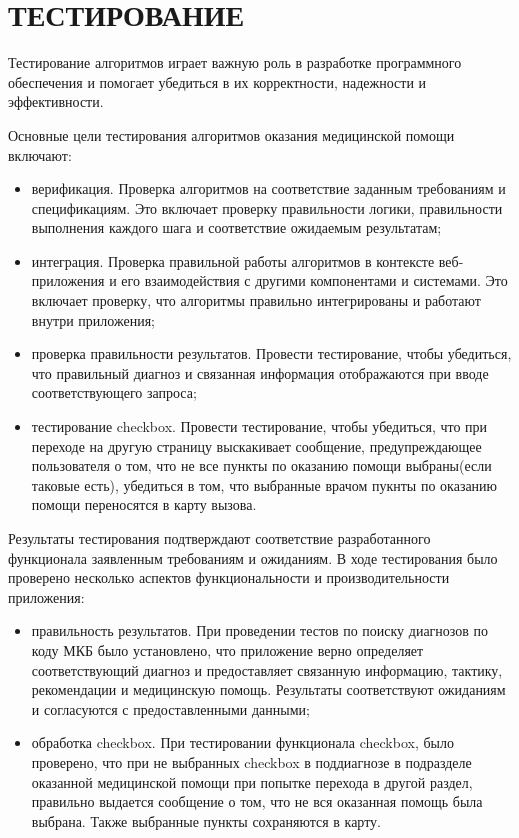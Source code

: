 \section{ТЕСТИРОВАНИЕ}

Тестирование алгоритмов играет важную роль в разработке программного обеспечения и помогает убедиться в их корректности, надежности и эффективности.

Основные цели тестирования алгоритмов оказания медицинской помощи включают:

\begin{itemize}
    \item верификация. Проверка алгоритмов на соответствие заданным требованиям и спецификациям. Это включает проверку правильности логики, правильности выполнения каждого шага и соответствие ожидаемым результатам;
    \item интеграция. Проверка правильной работы алгоритмов в контексте веб-приложения и его взаимодействия с другими компонентами и системами. Это включает проверку, что алгоритмы правильно интегрированы и работают внутри приложения;
    \item проверка правильности результатов. Провести тестирование, чтобы убедиться, что правильный диагноз и связанная информация отображаются при вводе соответствующего запроса;
    \item тестирование checkbox. Провести тестирование, чтобы убедиться, что при переходе на другую страницу выскакивает сообщение, предупреждающее пользователя о том, что не все пункты по оказанию помощи выбраны(если таковые есть), убедиться в том, что выбранные врачом пукнты по оказанию помощи переносятся в карту вызова.
\end{itemize}

Результаты тестирования подтверждают соответствие разработанного функционала заявленным требованиям и ожиданиям. В ходе тестирования было проверено несколько аспектов функциональности и производительности приложения:
\begin{itemize}
    \item правильность результатов. При проведении тестов по поиску диагнозов по коду МКБ было установлено, что приложение верно определяет соответствующий диагноз и предоставляет связанную информацию, тактику, рекомендации и медицинскую помощь. Результаты соответствуют ожиданиям и согласуются с предоставленными данными;
    \item обработка checkbox. При тестировании функционала checkbox, было проверено, что при не выбранных checkbox в поддиагнозе в подразделе оказанной медицинской помощи при попытке перехода в другой раздел, правильно выдается сообщение о том, что не вся оказанная помощь была выбрана. Также выбранные пункты сохраняются в карту.
\end{itemize}

